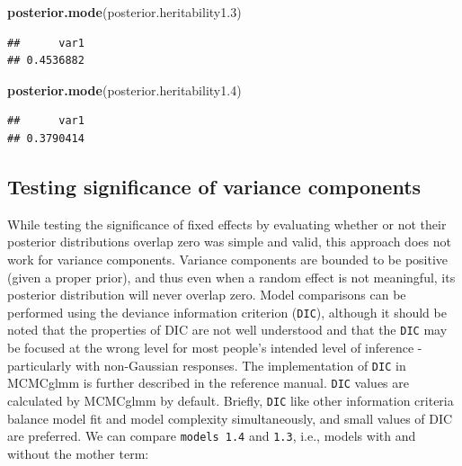 \documentclass[
  12pt,
]{book}
\newenvironment{Shaded}{\begin{snugshade}}{\end{snugshade}}
\newcommand{\FloatTok}[1]{\textcolor[rgb]{0.00,0.00,0.81}{#1}}
\newcommand{\KeywordTok}[1]{\textcolor[rgb]{0.13,0.29,0.53}{\textbf{#1}}}
\newcommand{\NormalTok}[1]{#1}
\newcommand{\OperatorTok}[1]{\textcolor[rgb]{0.81,0.36,0.00}{\textbf{#1}}}
\begin{document}
\begin{Shaded}
\begin{Highlighting}[]
\KeywordTok{posterior.mode}\NormalTok{(posterior.heritability1}\FloatTok{.3}\NormalTok{)}
\end{Highlighting}
\end{Shaded}

\begin{verbatim}
##      var1 
## 0.4536882
\end{verbatim}

\begin{Shaded}
\begin{Highlighting}[]
\KeywordTok{posterior.mode}\NormalTok{(posterior.heritability1}\FloatTok{.4}\NormalTok{)}
\end{Highlighting}
\end{Shaded}

\begin{verbatim}
##      var1 
## 0.3790414
\end{verbatim}

\hypertarget{testing-significance-of-variance-components}{%
\subsection{Testing significance of variance components}\label{testing-significance-of-variance-components}}

While testing the significance of fixed effects by evaluating whether or not their posterior distributions overlap zero was simple and valid, this approach does not work for variance components.
Variance components are bounded to be positive (given a proper prior), and thus even when a random effect is not meaningful, its posterior distribution will never overlap zero. Model comparisons can be performed using the deviance information criterion (\texttt{DIC}), although it should be noted that the properties of DIC are not well understood and that the \texttt{DIC} may be focused at the wrong level for most people's intended level of inference - particularly with non-Gaussian responses. The implementation of \texttt{DIC} in MCMCglmm is further described in the reference manual. \texttt{DIC} values are calculated by MCMCglmm by default. Briefly, \texttt{DIC} like other information criteria balance model fit and model complexity simultaneously, and small values of DIC are preferred. We can compare \texttt{models\ 1.4} and \texttt{1.3}, i.e., models with and without the mother term:

\begin{Shaded}
\end{Shaded}
\end{document}
